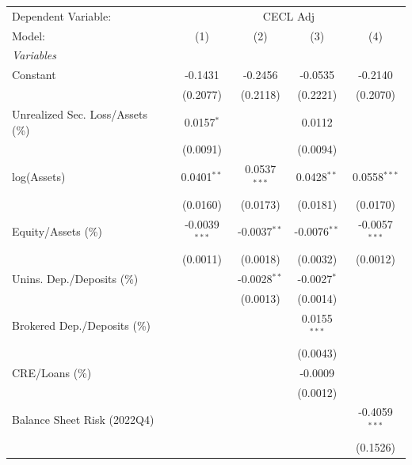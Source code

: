 
\begingroup
\centering
\begin{tabular}{lcccc}
   \tabularnewline \midrule \midrule
   Dependent Variable: & \multicolumn{4}{c}{CECL Adj}\\
   Model:                            & (1)             & (2)            & (3)            & (4)\\  
   \midrule
   \emph{Variables}\\
   Constant                          & -0.1431         & -0.2456        & -0.0535        & -0.2140\\   
                                     & (0.2077)        & (0.2118)       & (0.2221)       & (0.2070)\\   
   Unrealized Sec. Loss/Assets (\%)  & 0.0157$^{*}$    &                & 0.0112         &   \\   
                                     & (0.0091)        &                & (0.0094)       &   \\   
   log(Assets)                       & 0.0401$^{**}$   & 0.0537$^{***}$ & 0.0428$^{**}$  & 0.0558$^{***}$\\   
                                     & (0.0160)        & (0.0173)       & (0.0181)       & (0.0170)\\   
   Equity/Assets (\%)                & -0.0039$^{***}$ & -0.0037$^{**}$ & -0.0076$^{**}$ & -0.0057$^{***}$\\   
                                     & (0.0011)        & (0.0018)       & (0.0032)       & (0.0012)\\   
   Unins. Dep./Deposits (\%)         &                 & -0.0028$^{**}$ & -0.0027$^{*}$  &   \\   
                                     &                 & (0.0013)       & (0.0014)       &   \\   
   Brokered Dep./Deposits (\%)       &                 &                & 0.0155$^{***}$ &   \\   
                                     &                 &                & (0.0043)       &   \\   
   CRE/Loans (\%)                    &                 &                & -0.0009        &   \\   
                                     &                 &                & (0.0012)       &   \\   
   Balance Sheet Risk (2022Q4)       &                 &                &                & -0.4059$^{***}$\\   
                                     &                 &                &                & (0.1526)\\   

\end{tabular}
